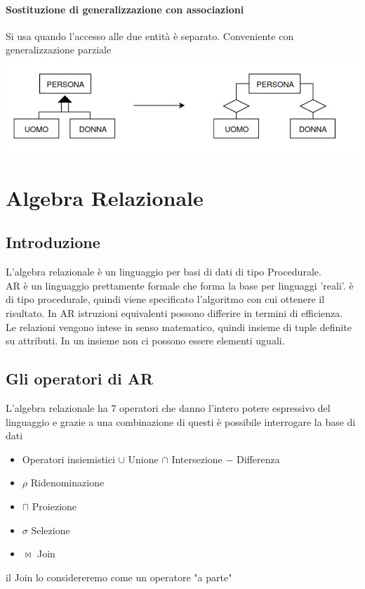 \documentclass[12pt, a4paper, openany]{book}
\begin{document}
\subsubsection{Sostituzione di generalizzazione con associazioni}
Si usa quando l'accesso alle due entità è separato. Conveniente con generalizzazione parziale
\\\includegraphics[width=\textwidth]{generalizzazioni3.png}

\chapter{Algebra Relazionale}
\section{Introduzione}
L'algebra relazionale è un linguaggio per basi di dati di tipo Procedurale.
\\
AR è un linguaggio prettamente formale che forma la base per linguaggi 'reali'. è di tipo procedurale, quindi viene specificato l'algoritmo con cui ottenere il risultato. In AR istruzioni equivalenti
possono differire in termini di efficienza.\\
Le relazioni vengono intese in senso matematico, quindi insieme di tuple definite su attributi. In un insieme non ci possono essere elementi uguali. 

\section{Gli operatori di AR}
L'algebra relazionale ha 7 operatori che danno l'intero potere espressivo del linguaggio e grazie a una combinazione di questi è possibile interrogare la base di dati

\begin{itemize}
    \item Operatori insiemistici
    \subitem $\cup$ Unione 
    \subitem $\cap$ Intersezione 
    \subitem $-$ Differenza
    \item $\rho$ Ridenominazione
    \item $\sqcap$ Proiezione
    \item $\sigma$ Selezione
    \item $\bowtie$ Join

\end{itemize}
il Join lo considereremo come un operatore "a parte"
\end{document}
